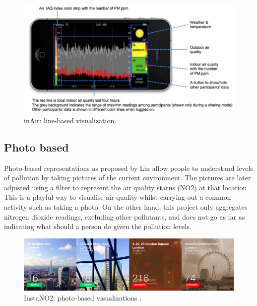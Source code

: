 \begin{figure}[H]
\begin{adjustbox}{width=1\textwidth,center=\textwidth}
  \centering
  \includegraphics[scale=1]{images/InAir.png}
\end{adjustbox}
  \caption[inAir project: line-based visualizations]{inAir: line-based visualization\cite{Kim2013}.}
  \label{fig:line_based_inAir}
\end{figure}


\subsection{Photo based}
Photo-based representations as proposed by Lin \cite{Lin2014} allow people to understand levels of pollution by taking pictures of the current environment. The pictures are later adjusted using a filter to represent the air quality status (NO2) at that location. This is a playful way to visualise air quality whilst carrying out a common activity such as taking a photo. On the other hand, this project only aggregates nitrogen dioxide readings, excluding other pollutants, and does not go as far as indicating what should a person do given the pollution levels.

\begin{figure}[H]
\begin{adjustbox}{width=.8\textwidth,center=\textwidth}
  \centering
  \includegraphics[scale=.4]{images/instaNO2.jpg}
\end{adjustbox}
  \caption[InstaNO2 project: photo-based visualizations]{InstaNO2: photo-based visualizations \cite{Lin2014}.}
  \label{fig:photo_based_instaNO2}
\end{figure}

